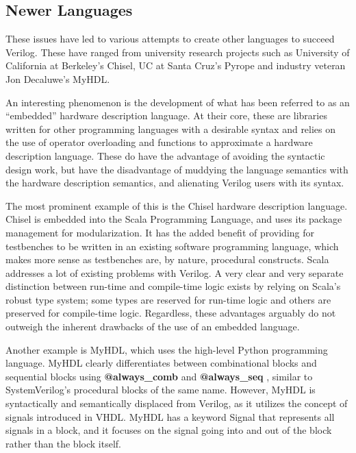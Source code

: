 \documentclass[10pt, two column]{article}
\theoremstyle{definition}
\begin{document}
\subsection{Newer Languages}
These issues have led to various attempts to create other languages to succeed Verilog. These have ranged from university research projects such as University of California at Berkeley’s Chisel\cite{Chisel_2012}, UC at Santa Cruz’s Pyrope\cite{Pyrope} and industry veteran Jon Decaluwe’s MyHDL\cite{MyHDLmanual_2018}.\par

An interesting phenomenon is the development of what has been referred to as an “embedded” hardware description language. At their core, these are libraries written for other programming languages with a desirable syntax and relies on the use of operator overloading and functions to approximate a hardware description language. These do have the advantage of avoiding the syntactic design work, but have the disadvantage of muddying the language semantics with the hardware description semantics, and alienating Verilog users with its syntax.\par 

The most prominent example of this is the Chisel hardware description language. Chisel is embedded into the Scala Programming Language\cite{scalaOverview2004}, and uses its package management for modularization.  It has the added benefit of providing for testbenches to be written in an existing software programming language, which makes more sense as testbenches are, by nature, procedural constructs. Scala addresses a lot of existing problems with Verilog.  A very clear and very separate distinction between run-time and compile-time logic exists by relying on Scala’s robust type system; some types are reserved for run-time logic and others are preserved for compile-time logic. Regardless, these advantages arguably do not outweigh the inherent drawbacks of the use of an embedded language.\cite{Chisel_2012}\par

Another example is MyHDL, which uses the high-level Python programming language. MyHDL clearly differentiates between combinational blocks and sequential blocks using \textbf{@always\_comb} and \textbf{@always\_seq} \cite{MyHDLmanual_2018}, similar to SystemVerilog’s procedural blocks of the same name. However, MyHDL is syntactically and semantically displaced from Verilog, as it utilizes the concept of signals introduced in VHDL\cite{VHDLmanual_2009}. MyHDL has a keyword Signal that represents all signals in a block, and it focuses on the signal going into and out of the block rather than the block itself\cite{MyHDLmanual_2018}.\par
\end{document}
